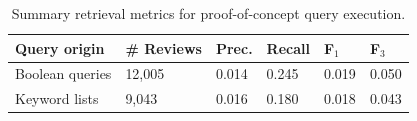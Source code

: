 \begin{table}[t]
\centering
\sffamily
\renewcommand{\arraystretch}{1.1}
\caption{Summary retrieval metrics for proof-of-concept query execution.}
\label{tab:retrieval-aggregate}
\begin{tabular*}{\columnwidth}{@{\extracolsep{\fill}}llllll}
\toprule
\textbf{Query origin} & \textbf{\# Reviews} & \textbf{Prec.} & \textbf{Recall} & \textbf{F$_1$} & \textbf{F$_3$} \\
\midrule
Boolean queries & 12,005 & 0.014 & 0.245 & 0.019 & 0.050 \\
Keyword lists   & 9,043 & 0.016 & 0.180 & 0.018 & 0.043 \\
\bottomrule
\end{tabular*}
\end{table}
